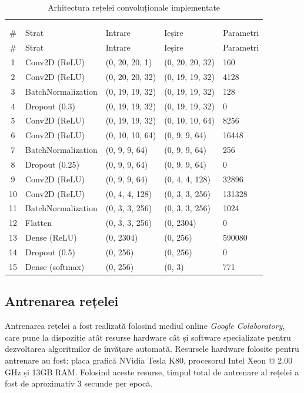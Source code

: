 \begin{longtable}{@{}c*4l@{}}
\renewcommand{\arraystretch}{1.2}\\
\caption{Arhitectura rețelei convoluționale implementate}\label{tabel:cnn-arch}\\
\rowcolor{gray!50}
\# & Strat & Intrare & Ieșire & Parametri \\
\endfirsthead
\rowcolor{gray!50}
\# & Strat & Intrare & Ieșire & Parametri \\
\endhead
1 & Conv2D (ReLU) & (0, 20, 20, 1) & (0, 20, 20, 32) & 160 \\
2 & Conv2D (ReLU) & (0, 20, 20, 32) & (0, 19, 19, 32) & 4128 \\
3 & BatchNormalization & (0, 19, 19, 32) & (0, 19, 19, 32) & 128 \\
4 & Dropout (0.3) & (0, 19, 19, 32) & (0, 19, 19, 32) & 0 \\
5 & Conv2D (ReLU) & (0, 19, 19, 32) & (0, 10, 10, 64) & 8256 \\
6 & Conv2D (ReLU) & (0, 10, 10, 64) & (0, 9, 9, 64) & 16448 \\
7 & BatchNormalization & (0, 9, 9, 64) & (0, 9, 9, 64) & 256 \\
8 & Dropout (0.25) & (0, 9, 9, 64) & (0, 9, 9, 64) & 0 \\
9 & Conv2D (ReLU) & (0, 9, 9, 64) & (0, 4, 4, 128) & 32896 \\
10 & Conv2D (ReLU) & (0, 4, 4, 128) & (0, 3, 3, 256) & 131328 \\
11 & BatchNormalization & (0, 3, 3, 256) & (0, 3, 3, 256) & 1024 \\ \midrule
12 & Flatten & (0, 3, 3, 256) & (0, 2304) & 0 \\
13 & Dense (ReLU) & (0, 2304) & (0, 256) & 590080 \\
14 & Dropout (0.5) & (0, 256) & (0, 256) & 0 \\
15 & Dense (softmax) & (0, 256) & (0, 3) & 771 \\ \bottomrule
\end{longtable}

\subsection{Antrenarea rețelei}\label{ssch:antrenarea}
Antrenarea rețelei a fost realizată folosind mediul online \textit{Google Colaboratory}, care pune la dispoziție atât resurse hardware cât și software specializate pentru dezvoltarea algoritmilor de învățare automată. Resursele hardware folosite pentru antrenare au fost: placa grafică NVidia Tesla K80, procesorul Intel Xeon @ 2.00 GHz și 13GB RAM. Folosind aceste resurse, timpul total de antrenare al rețelei a fost de aproximativ 3 secunde per epocă.

